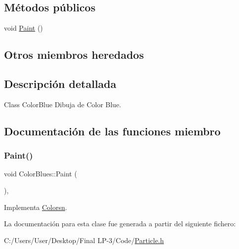 \subsection*{Métodos públicos}
\begin{DoxyCompactItemize}
\item 
void \mbox{\hyperlink{class_color_blues_a26e352d880a8aefa7b50923ee3e577b2}{Paint}} ()
\end{DoxyCompactItemize}
\subsection*{Otros miembros heredados}


\subsection{Descripción detallada}
Class Color\+Blue Dibuja de Color Blue. 

\subsection{Documentación de las funciones miembro}
\mbox{\label{class_color_blues_a26e352d880a8aefa7b50923ee3e577b2}} 
\subsubsection{\texorpdfstring{Paint()}{Paint()}}
{\footnotesize\ttfamily void Color\+Blues\+::\+Paint (\begin{DoxyParamCaption}{ }\end{DoxyParamCaption})\hspace{0.3cm}{\ttfamily [inline]}, {\ttfamily [virtual]}}



Implementa \mbox{\hyperlink{class_colorsn_ac9c430f99f9e990491ae0ccc49f36d59}{Colorsn}}.



La documentación para esta clase fue generada a partir del siguiente fichero\+:\begin{DoxyCompactItemize}
\item 
C\+:/\+Users/\+User/\+Desktop/\+Final L\+P-\/3/\+Code/\mbox{\hyperlink{_particle_8h}{Particle.\+h}}\end{DoxyCompactItemize}

